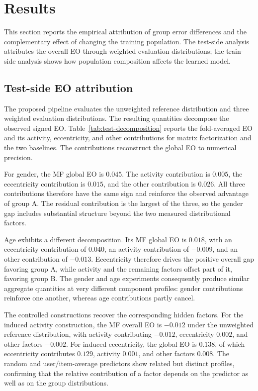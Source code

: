 \documentclass[11pt]{article}
\begin{document}
\section{Results}
\label{sec:results}

This section reports the empirical attribution of group error differences and
the complementary effect of changing the training population. The test-side
analysis attributes the overall EO through weighted evaluation distributions;
the train-side analysis shows how population composition affects the learned
model.

\subsection{Test-side EO attribution}

The proposed pipeline evaluates the unweighted reference distribution and three
weighted evaluation distributions. The resulting quantities decompose the
observed signed EO. Table~\ref{tab:test-decomposition}
reports the fold-averaged EO and its activity, eccentricity, and other
contributions for matrix factorization and the two baselines. The contributions
reconstruct the global EO to numerical precision.



For gender, the MF global EO is $0.045$. The activity contribution is $0.005$,
the eccentricity contribution is $0.015$, and the other contribution is
$0.026$. All three contributions therefore have the same sign and reinforce
the observed advantage of group A. The residual contribution is the largest
of the three, so the gender gap includes substantial structure beyond the two
measured distributional factors.

Age exhibits a different decomposition. Its MF global EO is $0.018$, with an
eccentricity contribution of $0.040$, an activity contribution of $-0.009$,
and an other contribution of $-0.013$. Eccentricity therefore drives the
positive overall gap favoring group A, while activity and the remaining factors offset part of
it, favoring group B. The gender and age experiments consequently produce similar aggregate
quantities at very different component profiles: gender contributions
reinforce one another, whereas age contributions partly cancel.

The controlled constructions recover the corresponding hidden factors. For
the induced activity construction, the MF overall EO is $-0.012$ under the
unweighted reference distribution, with activity contributing $-0.012$,
eccentricity $0.002$, and other factors $-0.002$. For induced eccentricity,
the global EO is $0.138$, of which eccentricity contributes $0.129$, activity
$0.001$, and other factors $0.008$. The random and user/item-average
predictors show related but distinct profiles, confirming that the relative
contribution of a factor depends on the predictor as well as on the group
distributions.
\end{document}
